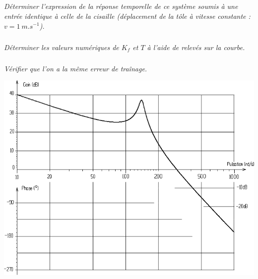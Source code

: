 \documentclass[10pt,fleqn]{article} %
\begin{document}
\begin{multicols}{2}
\subparagraph{}\textit{Déterminer l’expression de la réponse temporelle de ce système soumis à une entrée identique à celle de la cisaille (déplacement de la tôle à vitesse constante : $v = \SI{1}{m.s^{-1}}$).}

\subparagraph{}\textit{Déterminer les valeurs numériques de $K_f$ et $T$ à l’aide de relevés sur la courbe.}

\subparagraph{}\textit{Vérifier que l’on a la même erreur de traînage.}

\end{multicols}

\begin{center}
\includegraphics[width=\linewidth]{images/fig_02}
\end{center}
\end{document}
